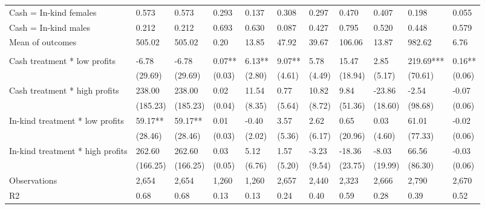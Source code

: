\begin{table}[H]
{\begin{tabular}{lllllllllll}
\hspace{1em}\hspace{1em} Cash = In-kind females & 0.573 & 0.573 & 0.293 & 0.137 & 0.308 & 0.297 & 0.470 & 0.407 & 0.198 & 0.055\\
\hspace{1em}\hspace{1em} Cash = In-kind males & 0.212 & 0.212 & 0.693 & 0.630 & 0.087 & 0.427 & 0.795 & 0.520 & 0.448 & 0.579\\
\hspace{1em}Mean of outcomes & 505.02 & 505.02 & 0.20 & 13.85 & 47.92 & 39.67 & 106.06 & 13.87 & 982.62 & 6.76\\
\addlinespace[0.3em]
\multicolumn{11}{l}{\textbf{Panel B: Female sub-sample}}\\
\hspace{1em}Cash treatment * low profits & -6.78 & -6.78 & 0.07** & 6.13** & 9.07** & 5.78 & 15.47 & 2.85 & 219.69*** & 0.16**\\
\hspace{1em} & (29.69) & (29.69) & (0.03) & (2.80) & (4.61) & (4.49) & (18.94) & (5.17) & (70.61) & (0.06)\\
\hspace{1em}Cash treatment * high profits & 238.00 & 238.00 & 0.02 & 11.54 & 0.77 & 10.82 & 9.84 & -23.86 & -2.54 & -0.07\\
\hspace{1em} & (185.23) & (185.23) & (0.04) & (8.35) & (5.64) & (8.72) & (51.36) & (18.60) & (98.68) & (0.06)\\
\hspace{1em}In-kind treatment * low profits & 59.17** & 59.17** & 0.01 & -0.40 & 3.57 & 2.62 & 0.65 & 0.03 & 61.01 & -0.02\\
\hspace{1em} & (28.46) & (28.46) & (0.03) & (2.02) & (5.36) & (6.17) & (20.96) & (4.60) & (77.33) & (0.06)\\
\hspace{1em}In-kind treatment * high profits & 262.60 & 262.60 & 0.03 & 5.12 & 1.57 & -3.23 & -18.36 & -8.03 & 66.56 & -0.03\\
\hspace{1em} & (166.25) & (166.25) & (0.05) & (6.76) & (5.20) & (9.54) & (23.75) & (19.99) & (86.30) & (0.06)\\
\hspace{1em}Observations & 2,654 & 2,654 & 1,260 & 1,260 & 2,657 & 2,440 & 2,323 & 2,666 & 2,790 & 2,670\\
\hspace{1em}R2 & 0.68 & 0.68 & 0.13 & 0.13 & 0.24 & 0.40 & 0.59 & 0.28 & 0.39 & 0.52\\

\end{tabular}}
\end{table}

